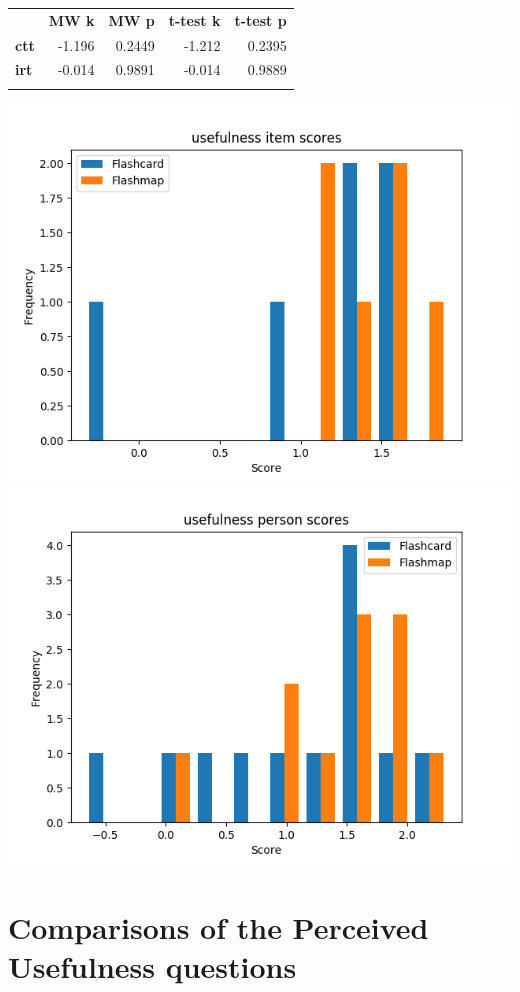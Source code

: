 \begin{longtable}[c]{@{}lrrrr@{}}
\toprule\addlinespace
& \textbf{MW k} & \textbf{MW p} &
\textbf{t-test k} & \textbf{t-test p}
\\\addlinespace
\midrule
\textbf{ctt} & -1.196 & 0.2449 & -1.212 & 0.2395
\\\addlinespace
\textbf{irt} & -0.014 & 0.9891 & -0.014 & 0.9889
\\\addlinespace
\bottomrule
\end{longtable}

\includegraphics[width=\textwidth]{img/usefulness_diff.png}
\includegraphics[width=\textwidth]{img/usefulness_abil.png}

\section{Comparisons of the Perceived Usefulness questions}

